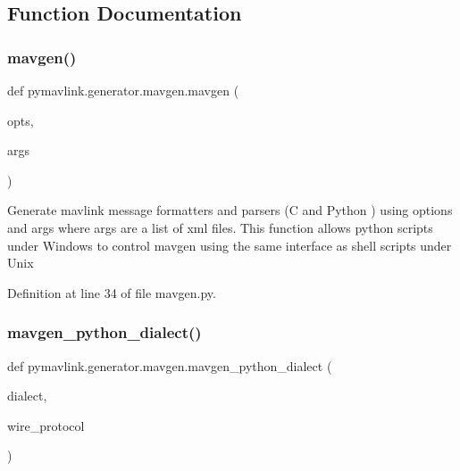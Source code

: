 \subsection{Function Documentation}
\mbox{\label{namespacepymavlink_1_1generator_1_1mavgen_a457749ca62432f0cf01d11d6a0a6e09e}} 
\subsubsection{\texorpdfstring{mavgen()}{mavgen()}}
{\footnotesize\ttfamily def pymavlink.\+generator.\+mavgen.\+mavgen (\begin{DoxyParamCaption}\item[{}]{opts,  }\item[{}]{args }\end{DoxyParamCaption})}

\begin{DoxyVerb}Generate mavlink message formatters and parsers (C and Python ) using options
and args where args are a list of xml files. This function allows python
scripts under Windows to control mavgen using the same interface as
shell scripts under Unix\end{DoxyVerb}
 

Definition at line 34 of file mavgen.\+py.

\mbox{\label{namespacepymavlink_1_1generator_1_1mavgen_a9dcfcc3bcf015ac643dc9335255a40df}} 
\subsubsection{\texorpdfstring{mavgen\_python\_dialect()}{mavgen\_python\_dialect()}}
{\footnotesize\ttfamily def pymavlink.\+generator.\+mavgen.\+mavgen\+\_\+python\+\_\+dialect (\begin{DoxyParamCaption}\item[{}]{dialect,  }\item[{}]{wire\+\_\+protocol }\end{DoxyParamCaption})}

